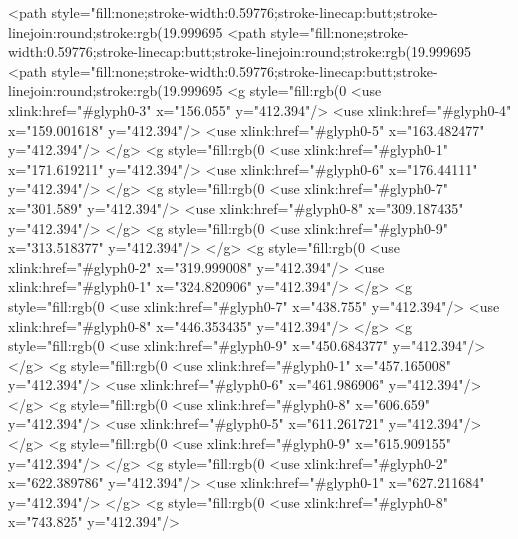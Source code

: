 <path style="fill:none;stroke-width:0.59776;stroke-linecap:butt;stroke-linejoin:round;stroke:rgb(19.999695%
<path style="fill:none;stroke-width:0.59776;stroke-linecap:butt;stroke-linejoin:round;stroke:rgb(19.999695%
<path style="fill:none;stroke-width:0.59776;stroke-linecap:butt;stroke-linejoin:round;stroke:rgb(19.999695%
<g style="fill:rgb(0%
  <use xlink:href="#glyph0-3" x="156.055" y="412.394"/>
  <use xlink:href="#glyph0-4" x="159.001618" y="412.394"/>
  <use xlink:href="#glyph0-5" x="163.482477" y="412.394"/>
</g>
<g style="fill:rgb(0%
  <use xlink:href="#glyph0-1" x="171.619211" y="412.394"/>
  <use xlink:href="#glyph0-6" x="176.44111" y="412.394"/>
</g>
<g style="fill:rgb(0%
  <use xlink:href="#glyph0-7" x="301.589" y="412.394"/>
  <use xlink:href="#glyph0-8" x="309.187435" y="412.394"/>
</g>
<g style="fill:rgb(0%
  <use xlink:href="#glyph0-9" x="313.518377" y="412.394"/>
</g>
<g style="fill:rgb(0%
  <use xlink:href="#glyph0-2" x="319.999008" y="412.394"/>
  <use xlink:href="#glyph0-1" x="324.820906" y="412.394"/>
</g>
<g style="fill:rgb(0%
  <use xlink:href="#glyph0-7" x="438.755" y="412.394"/>
  <use xlink:href="#glyph0-8" x="446.353435" y="412.394"/>
</g>
<g style="fill:rgb(0%
  <use xlink:href="#glyph0-9" x="450.684377" y="412.394"/>
</g>
<g style="fill:rgb(0%
  <use xlink:href="#glyph0-1" x="457.165008" y="412.394"/>
  <use xlink:href="#glyph0-6" x="461.986906" y="412.394"/>
</g>
<g style="fill:rgb(0%
  <use xlink:href="#glyph0-8" x="606.659" y="412.394"/>
  <use xlink:href="#glyph0-5" x="611.261721" y="412.394"/>
</g>
<g style="fill:rgb(0%
  <use xlink:href="#glyph0-9" x="615.909155" y="412.394"/>
</g>
<g style="fill:rgb(0%
  <use xlink:href="#glyph0-2" x="622.389786" y="412.394"/>
  <use xlink:href="#glyph0-1" x="627.211684" y="412.394"/>
</g>
<g style="fill:rgb(0%
  <use xlink:href="#glyph0-8" x="743.825" y="412.394"/>
